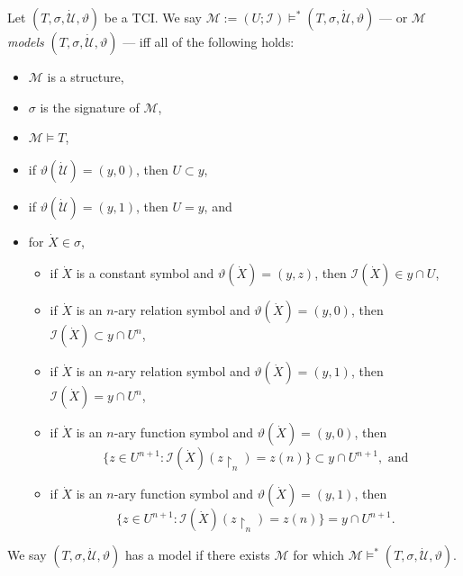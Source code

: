 \documentclass[12pt]{article}
\numberwithin{equation}{section}
\begin{document}
\begin{defi}
Let $(T, \sigma, \dot{\mathcal{U}}, \vartheta)$ be a TCI. We say $\mathcal{M} := (U; \mathcal{I}) \models^* (T, \sigma, \dot{\mathcal{U}}, \vartheta)$ --- or $\mathcal{M}$ \emph{models} $(T, \sigma, \dot{\mathcal{U}}, \vartheta)$ --- iff all of the following holds:
\begin{itemize}
    \item $\mathcal{M}$ is a structure,
    \item $\sigma$ is the signature of $\mathcal{M}$,
    \item $\mathcal{M} \models T$,
    \item if $\vartheta(\dot{\mathcal{U}}) = (y, 0)$, then $U \subset y$,
    \item if $\vartheta(\dot{\mathcal{U}}) = (y, 1)$, then $U = y$, and
    \item for $\dot{X} \in \sigma$,
    \begin{itemize}[label=$\circ$]
        \item if $\dot{X}$ is a constant symbol and $\vartheta(\dot{X}) = (y, z)$, then $\mathcal{I}(\dot{X}) \in y \cap U$,
        \item if $\dot{X}$ is an $n$-ary relation symbol and $\vartheta(\dot{X}) = (y, 0)$, then $\mathcal{I}(\dot{X}) \subset y \cap U^{n}$,
        \item if $\dot{X}$ is an $n$-ary relation symbol and $\vartheta(\dot{X}) = (y, 1)$, then $\mathcal{I}(\dot{X}) = y \cap U^{n}$,
        \item if $\dot{X}$ is an $n$-ary function symbol and $\vartheta(\dot{X}) = (y, 0)$, then $$\{z \in U^{n+1} : \mathcal{I}(\dot{X})(z \! \restriction_n) = z(n)\} \subset y \cap U^{n+1}, \text{ and}$$
        \item if $\dot{X}$ is an $n$-ary function symbol and $\vartheta(\dot{X}) = (y, 1)$, then $$\{z \in U^{n+1} : \mathcal{I}(\dot{X})(z \! \restriction_n) = z(n)\} = y \cap U^{n+1}.$$
    \end{itemize}
\end{itemize}
We say $(T, \sigma, \dot{\mathcal{U}}, \vartheta)$ has a model if there exists $\mathcal{M}$ for which $\mathcal{M} \models^* (T, \sigma, \dot{\mathcal{U}}, \vartheta)$.
\end{defi}
\end{document}

